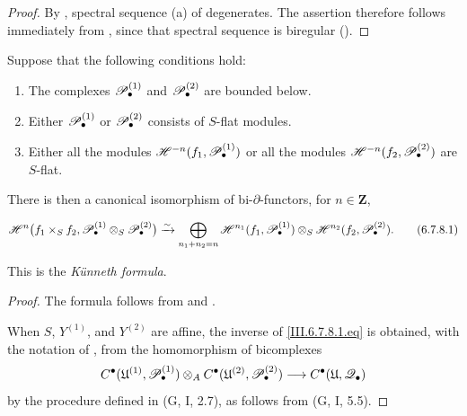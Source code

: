 \begin{proof}
By , spectral sequence \textnormal{(a)} of
 degenerates.  The assertion therefore follows
immediately from , since that spectral sequence
is biregular ().
\end{proof}

\begin{theorem}[6.7.8]
\label{III.6.7.8}
Suppose that the following conditions hold:
\begin{enumerate}
  \item[{$1^\circ$}]
    The complexes $\mathscr{P}_\bullet^{(1)}$ and
    $\mathscr{P}_\bullet^{(2)}$ are bounded below.
  \item[{$2^\circ$}]
    Either $\mathscr{P}_\bullet^{(1)}$ or
    $\mathscr{P}_\bullet^{(2)}$ consists of $S$-flat modules.


  \item[{$3^\circ$}]
    Either all the modules
    $\mathscr{H}^{-n}(f_1,\mathscr{P}_\bullet^{(1)})$ or all the modules
    $\mathscr{H}^{-n}(f_2,\mathscr{P}_\bullet^{(2)})$ are $S$-flat.
\end{enumerate}
There is then a canonical isomorphism of bi-$\partial$-functors,
for $n\in\mathbf Z$,
\begin{env}[6.7.8.1]
\label{III.6.7.8.1}
\[
  \mathscr{H}^n
  \bigl(
    f_1\times_Sf_2,
    \mathscr{P}_\bullet^{(1)}\otimes_S\mathscr{P}_\bullet^{(2)}
  \bigr)
  \xrightarrow{\sim}
  \bigoplus_{n_1+n_2=n}
  \mathscr{H}^{n_1}(f_1,\mathscr{P}_\bullet^{(1)})
  \otimes_S
  \mathscr{H}^{n_2}(f_2,\mathscr{P}_\bullet^{(2)}).
  \tag{6.7.8.1}\label{III.6.7.8.1.eq}
\]
\end{env}
This is the \emph{K\"unneth formula}.
\end{theorem}

\begin{proof}
The formula follows from  and
.

When $S$, $Y^{(1)}$, and $Y^{(2)}$ are affine, the inverse of
\eqref{III.6.7.8.1.eq} is obtained, with the notation of
, from the homomorphism of bicomplexes
\[
  C^\bullet(\mathfrak U^{(1)},\mathscr{P}_\bullet^{(1)})
  \otimes_A
  C^\bullet(\mathfrak U^{(2)},\mathscr{P}_\bullet^{(2)})
  \longrightarrow
  C^\bullet(\mathfrak U,\mathscr{Q}_\bullet)
\]
by the procedure defined in \textnormal{(G, I, 2.7)}, as follows
from \textnormal{(G, I, 5.5)}.
\end{proof}

